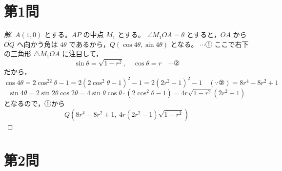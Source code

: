 \documentclass[../main.tex]{subfiles}
\begin{document}
\section*{第1問}

\begin{proof}[解]
  $A(1,0)$ とする。$\overline{AP}$ の中点 $M_1$ とする。
  $\angle M_1OA=\theta$ とすると，$\overline{OA}$ から $\overline{OQ}$ へ向かう角は $4\theta$ であるから，$Q(\cos4\theta,\sin4\theta)$ となる。 $\cdots$①
  ここで右下の三角形 $\triangle M_1OA$ に注目して，
  \[
    \sin\theta=\sqrt{1-r^2}, \quad \cos\theta=r \quad \cdots \text{②}
  \]
  だから，
  \[
    \cos4\theta=2\cos^22\theta-1=2(2\cos^2\theta-1)^2-1=2(2r^2-1)^2-1 \quad (\because②) = 8r^4-8r^2+1
  \]
  \[
    \sin4\theta=2\sin2\theta\cos2\theta=4\sin\theta\cos\theta\cdot(2\cos^2\theta-1)=4r\sqrt{1-r^2}(2r^2-1)
  \]
  となるので，①から
  \[
    Q\left(8r^4-8r^2+1,\ 4r(2r^2-1)\sqrt{1-r^2}\right)
  \]
\end{proof}

\newpage

\section*{第2問}
\end{document}
